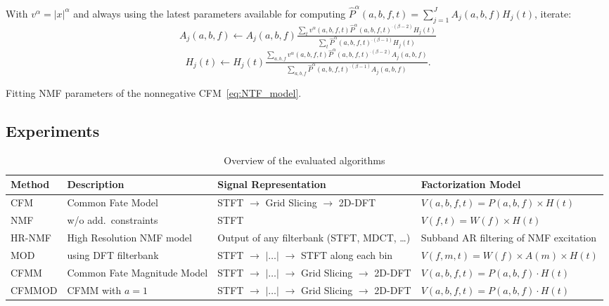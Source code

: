 \begin{algorithm}
With $v^{\alpha}=\left|x\right|^{\alpha}$ and always using the latest
parameters available for computing
 $\hat{P}^{\alpha}\left(a,b,f,t\right)=\sum\limits_{j=1}^{J}A_{j}\left(a,b,f\right)H_{j}\left(t\right)$,
iterate:
\[
A_{j}\left(a,b,f\right)\leftarrow A_{j}\left(a,b,f\right)\tfrac{\sum_{t}v^{\alpha}\left(a,b,f,t\right)\hat{P}^{\alpha}\left(a,b,f,t\right)^{\cdot\left(\beta-2\right)}H_{j}\left(t\right)}{\sum_{t}\hat{P}^{\alpha}\left(a,b,f,t\right)^{\cdot\left(\beta-1\right)}H_{j}\left(t\right)}
\]
\[
H_{j}\left(t\right)\leftarrow H_{j}\left(t\right)\tfrac{\sum_{a,b,f}v^{\alpha}\left(a,b,f,t\right)\hat{P}^{\alpha}\left(a,b,f,t\right)^{\cdot\left(\beta-2\right)}A_{j}\left(a,b,f\right)}{\sum_{a,b,f}\hat{P}^{\alpha}\left(a,b,f,t\right)^{\cdot\left(\beta-1\right)}A_{j}\left(a,b,f\right)}.
\]


\caption{Fitting NMF parameters of the nonnegative CFM~\eqref{eq:NTF_model}.\label{alg:Fitting-NTF}}
\end{algorithm}

\subsection{Experiments}
\label{sec:experiment}

\begin{table}[ht!]
  \centering
  \tiny
\begin{tabular}{ llll }
    \toprule
    Method & Description & Signal Representation & Factorization Model \\
    \midrule
    CFM & Common Fate Model & STFT $\rightarrow$ Grid Slicing $\rightarrow$ 2D-DFT & $V(a,b,f,t) = P(a,b,f)\times H(t)$ \\
    NMF &\cite{virtanen07} w/o add.\ constraints & STFT & $V(f,t) = W(f)\times H(t)$ \\
    HR-NMF & High Resolution NMF model~\cite{magron15a} & Output of any filterbank (STFT, MDCT, \ldots)  & Subband AR filtering of NMF excitation \\
    MOD &\cite{barker13} using DFT filterbank& STFT $\rightarrow$ $|\ldots|$ $\rightarrow$ STFT along each bin & $V(f,m,t) = W(f)\times A(m)\times H(t)$ \\
    CFMM & Common Fate Magnitude Model & STFT $\rightarrow$ $|\ldots|$ $\rightarrow$ Grid Slicing $\rightarrow$ 2D-DFT & $V(a,b,f,t) = P(a,b,f)\cdot H(t)$ \\
    CFMMOD & CFMM with $a=1$ & STFT $\rightarrow$ $|\ldots|$ $\rightarrow$ Grid Slicing $\rightarrow$ 2D-DFT & $V(a,b,f,t) = P(a,b,f)\cdot H(t)$ \\
    \bottomrule
\end{tabular}
\caption{Overview of the evaluated algorithms}
\label{tab:methods}
\end{table}

